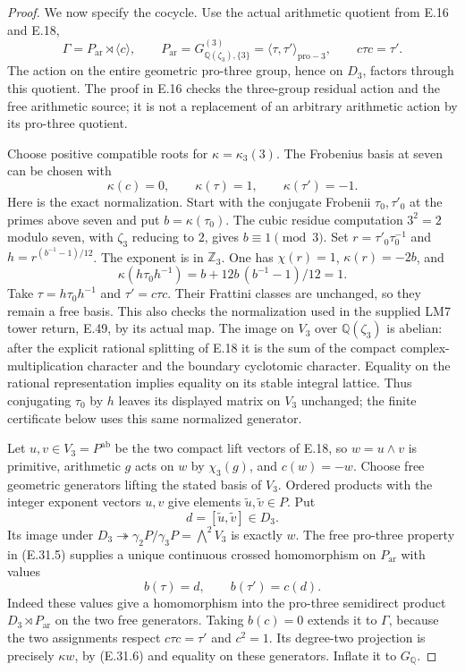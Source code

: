 \begin{proof}
We now specify the cocycle. Use the actual arithmetic
quotient from E.16 and E.18,
\[
 \Gamma=P_{\mathrm{ar}}\rtimes\langle c\rangle,
 \qquad
 P_{\mathrm{ar}}=G_{\mathbb Q(\zeta_3),\{3\}}^{(3)}
                  =\langle\tau,\tau'\rangle_{\mathrm{pro}-3},
 \qquad c\tau c=\tau'.
 \tag{E.31.5}
\]
The action on the entire geometric pro-three group, hence
on $D_3$, factors through this quotient. The proof in E.16
checks the three-group residual action and the free arithmetic
source; it is not a replacement of an arbitrary arithmetic
action by its pro-three quotient.

Choose positive compatible roots for $\kappa=\kappa_3(3)$.
The Frobenius basis at seven can be chosen with
\[
                    \kappa(c)=0,\qquad
                    \kappa(\tau)=1,\qquad
                    \kappa(\tau')=-1.
 \tag{E.31.6}
\]
Here is the exact normalization. Start with the conjugate
Frobenii $\tau_0,\tau'_0$ at the primes above seven and put
$b=\kappa(\tau_0)$. The cubic residue computation
$3^2=2$ modulo seven, with $\zeta_3$ reducing to $2$,
gives $b\equiv1\pmod3$. Set
$r=\tau'_0\tau_0^{-1}$ and
$h=r^{(b^{-1}-1)/12}$. The exponent is in $\mathbb Z_3$.
One has $\chi(r)=1$, $\kappa(r)=-2b$, and
\[
 \kappa(h\tau_0h^{-1})
    =b+12b\,(b^{-1}-1)/12=1.
\]
Take $\tau=h\tau_0h^{-1}$ and $\tau'=c\tau c$.
Their Frattini classes are unchanged, so they remain a
free basis. This also checks the normalization used in
the supplied LM7 tower return, E.49, by its actual map.
The image on $V_3$ over $\mathbb Q(\zeta_3)$ is abelian:
after the explicit rational splitting of E.18 it is the
sum of the compact complex-multiplication character and
the boundary cyclotomic character. Equality on the rational
representation implies equality on its stable integral
lattice. Thus conjugating $\tau_0$ by $h$ leaves its
displayed matrix on $V_3$ unchanged; the finite certificate
below uses this same normalized generator.

Let $u,v\in V_3=P^{\mathrm{ab}}$ be the two compact
lift vectors of E.18, so $w=u\wedge v$ is primitive,
arithmetic $g$ acts on $w$ by $\chi_3(g)$, and
$c(w)=-w$. Choose free geometric generators lifting
the stated basis of $V_3$. Ordered products with the
integer exponent vectors $u,v$ give elements
$\widetilde u,\widetilde v\in P$. Put
\[
                  d=[\widetilde u,\widetilde v]\in D_3.
\]
Its image under $D_3\twoheadrightarrow
\gamma_2P/\gamma_3P=\bigwedge^2V_3$ is exactly $w$.
The free pro-three property in (E.31.5) supplies a unique
continuous crossed homomorphism on $P_{\mathrm{ar}}$
with values
\[
                       b(\tau)=d,\qquad b(\tau')=c(d).
\]
Indeed these values give a homomorphism into the pro-three
semidirect product $D_3\rtimes P_{\mathrm{ar}}$ on the two
free generators. Taking $b(c)=0$ extends it to $\Gamma$,
because the two assignments respect $c\tau c=\tau'$ and
$c^2=1$. Its degree-two projection is precisely
$\kappa w$, by (E.31.6) and equality on these generators.
Inflate it to $G_{\mathbb Q}$.


\end{proof}
